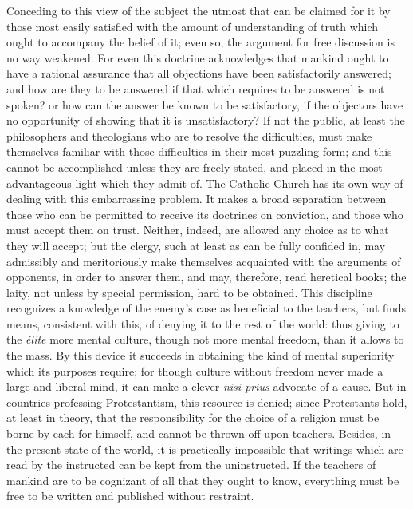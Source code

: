 \documentclass[12pt]{report}
\begin{document}
Conceding to this view of the subject the utmost that can be claimed for it by those most easily satisfied with the amount of understanding of truth which ought to accompany the belief of it; even so, the argument for free discussion is no way weakened. For even this doctrine acknowledges that mankind ought to have a rational assurance that all objections have been satisfactorily answered; and how are they to be answered if that which requires to be answered is not spoken? or how can the answer be known to be satisfactory, if the objectors have no opportunity of showing that it is unsatisfactory? If not the public, at least the philosophers and theologians who are to resolve the difficulties, must make themselves familiar with those difficulties in their most puzzling form; and this cannot be accomplished unless they are freely stated, and placed in the most advantageous light which they admit of. The Catholic Church has its own way of dealing with this embarrassing problem. It makes a broad separation between those who can be permitted to receive its doctrines on conviction, and those who must accept them on trust. Neither, indeed, are allowed any choice as to what they will accept; but the clergy, such at least as can be fully confided in, may admissibly and meritoriously make themselves acquainted with the arguments of opponents, in order to answer them, and may, therefore, read heretical books; the laity, not unless by special permission, hard to be obtained. This discipline recognizes a knowledge of the enemy's case as beneficial to the teachers, but finds means, consistent with this, of denying it to the rest of the world: thus giving to the \emph{\'elite} more mental culture, though not more mental freedom, than it allows to the mass. By this device it succeeds in obtaining the kind of mental superiority which its purposes require; for though culture without freedom never made a large and liberal mind, it can make a clever \emph{nisi prius} advocate of a cause. But in countries professing Protestantism, this resource is denied; since Protestants hold, at least in theory, that the responsibility for the choice of a religion must be borne by each for himself, and cannot be thrown off upon teachers. Besides, in the present state of the world, it is practically impossible that writings which are read by the instructed can be kept from the uninstructed. If the teachers of mankind are to be cognizant of all that they ought to know, everything must be free to be written and published without restraint.
\end{document}
